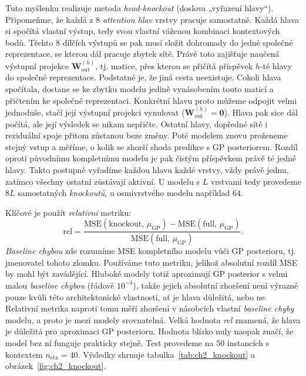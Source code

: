 Tuto myšlenku realizuje metoda \textit{head-knockout} (doslova „vyřazení hlavy“).
Připomeňme, že každá z $8$ \emph{attention hlav} vrstvy pracuje samostatně.
Každá hlava si spočítá vlastní výstup, tedy svou vlastní váženou kombinaci kontextových bodů.
Těchto $8$ dílčích výstupů se pak musí složit dohromady do jedné společné reprezentace, se kterou dál pracuje zbytek sítě.
Právě toto zajišťuje naučená výstupní projekce $\mathbf{W}_{\text{out}}^{(h)}$, tj. matice, přes kterou se přičítá příspěvek $h$-té hlavy do společné reprezentace.
Podstatné je, že jiná cesta neexistuje.
Cokoli hlava spočítala, dostane se ke zbytku modelu jedině vynásobením touto maticí a přičtením ke společné reprezentaci.
Konkrétní hlavu proto můžeme odpojit velmi jednoduše, stačí její výstupní projekci vynulovat ($\mathbf{W}_{\text{out}}^{(h)} = \mathbf{0}$).
Hlava pak sice dál počítá, ale její výsledek se nikam nepřičte.
Ostatní hlavy, dopředné sítě i reziduální spoje přitom zůstanou beze změny.
Poté modelem znovu proženeme stejný vstup a měříme, o kolik se zhorší shoda predikce s GP posteriorem.
Rozdíl oproti původnímu kompletnímu modelu je pak čistým příspěvkem právě té jedné hlavy.
Takto postupně vyřadíme každou hlavu každé vrstvy, vždy právě jednu, zatímco všechny ostatní zůstávají aktivní.
U modelu s $L$ vrstvami tedy provedeme $8L$ samostatných \emph{knockoutů}, u osmivrstvého modelu například $64$.
\par

Klíčové je použít \textit{relativní} metriku:
$$\text{rel} = \frac{\text{MSE}(\text{knockout},\, \mu_{\text{GP}}) - \text{MSE}(\text{full},\, \mu_{\text{GP}})}{\text{MSE}(\text{full},\, \mu_{\text{GP}})}.$$
\textit{Baseline chybou} zde rozumíme MSE kompletního modelu vůči GP posterioru, tj. jmenovatel tohoto zlomku.
Používáme tuto metriku, jelikož absolutní rozdíl MSE by mohl být zavádějící.
Hluboké modely totiž aproximují GP posterior s velmi malou \emph{baseline chybou} (řádově $10^{-4}$), takže jejich absolutní zhoršení není výrazné pouze kvůli této architektonické vlastnosti, ať je hlava důležitá, nebo ne.
Relativní metrika naproti tomu měří zhoršení v násobcích vlastní \emph{baseline chyby} modelu, a proto je mezi modely srovnatelná.
Velká hodnota \textit{rel} znamená, že hlava je důležitá pro aproximaci GP posterioru.
Hodnota blízko nuly naopak značí, že model bez ní funguje prakticky stejně.
Test provedeme na $50$ instancích s kontextem $n_{\text{ctx}} = 40$.
Výsledky shrnuje tabulka~\ref{tab:ch2_knockout} a obrázek~\ref{fig:ch2_knockout}.

